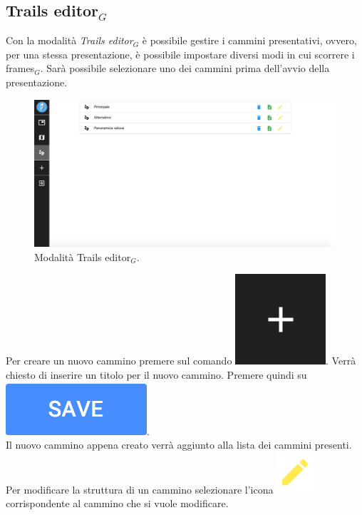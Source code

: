 \subsection{Trails editor$_G$}
Con la modalità \emph{Trails editor$_G$} è possibile gestire i cammini presentativi, ovvero, per una stessa presentazione, è possibile impostare diversi modi in cui scorrere i frames$_G$. Sarà possibile selezionare uno dei cammini prima dell'avvio della presentazione.\\

\begin{figure}[!h]
\begin{center}
\includegraphics[scale=0.35]{img/trails_editor_screen.png}
\caption{Modalità Trails editor$_G$.}
\end{center}
\end{figure}

Per creare un nuovo cammino premere sul comando \includegraphics[scale=0.4]{img/add_object.png}. Verrà chiesto di inserire un titolo per il nuovo cammino. Premere quindi su \includegraphics[scale=0.5]{img/save_confirm.png}.\\
Il nuovo cammino appena creato verrà aggiunto alla lista dei cammini presenti.\\
Per modificare la struttura di un cammino selezionare l'icona \includegraphics[scale=0.7]{img/edit.png} corrispondente al cammino che si vuole modificare.

